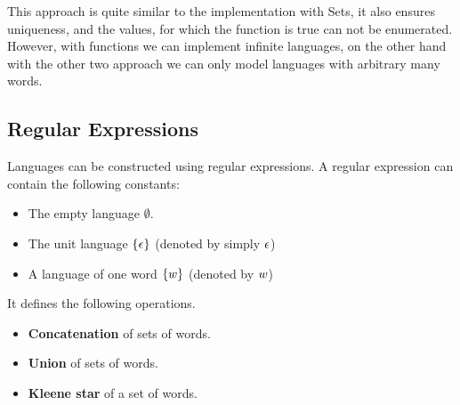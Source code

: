 This approach is quite similar to the implementation with Sets, it also ensures uniqueness, and the values, for which the function is true can not be enumerated. However, with functions we can implement infinite languages, on the other hand with the other two approach we can only model languages with arbitrary many words.

\subsection{Regular Expressions}

Languages can be constructed using regular expressions. A regular expression can contain the following constants:
\begin{itemize}
	\item The empty language $\emptyset$.
	\item The unit language $\{\epsilon\}$ (denoted by simply $\epsilon$)
	\item A language of one word $\{w\}$ (denoted by $w$)
\end{itemize}

It defines the following operations.
\begin{itemize}
	\item \textbf{Concatenation} of sets of words.
	\item \textbf{Union} of sets of words.
	\item \textbf{Kleene star} of a set of words.
\end{itemize}


